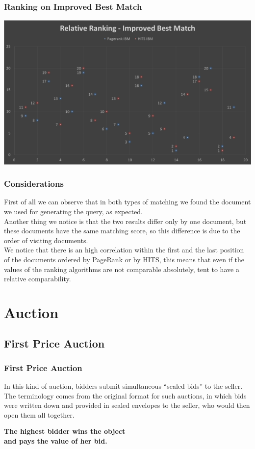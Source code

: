 \documentclass{beamer}
\begin{document}
\begin{frame}
\frametitle{Ranking on Improved Best Match}
\begin{center}
\includegraphics[scale=0.20]{img/Search/Improved.PNG} 
\end{center}
\end{frame}


\begin{frame}
\frametitle{Considerations}
First of all we can observe that in both types of matching we found the document we used for generating the query, as expected.\\
\medskip
Another thing we notice is that the two results differ only by one document, but these documents have the same matching score, so this difference is due to the order of visiting documents.\\
\medskip
We notice that there is an \alert{high} correlation within the first and the last position of the documents ordered by PageRank or by HITS, this means that even if the values of the ranking algorithms are not comparable absolutely, tent to have a \alert{relative} comparability.
\end{frame}




\section{Auction}

\subsection{First Price Auction}
\begin{frame}
\frametitle{First Price Auction}
In this kind of auction, bidders submit simultaneous ``sealed bids'' to the seller. The terminology comes from the original format for such auctions, in which bids were written down and provided in sealed envelopes to the seller, who would then open them all together.\\
\medskip
\begin{center}\textbf{The highest bidder wins the object \\ and pays the value of her bid.}\end{center}
\end{frame}
\end{document}
